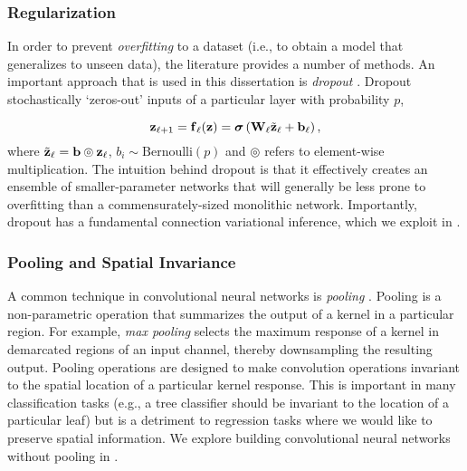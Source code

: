 \subsubsection{Regularization}

In order to prevent \textit{overfitting} to a dataset (i.e., to obtain a model that generalizes to unseen data), the literature provides a number of methods. An important approach that is used in this dissertation is \textit{dropout} \citep{srivastava_dropout_2014}. Dropout stochastically `zeros-out' inputs of a particular layer with probability $p$, 

\begin{equation}
	\boldsymbol{\mathbf{z}}_{\ell+1} = \boldsymbol{\mathbf{f}}_\ell(\boldsymbol{\mathbf{z}}) = \boldsymbol{\mathbf{\sigma}}\left(\boldsymbol{\mathbf{W}}_\ell\tilde{\boldsymbol{\mathbf{z}}}_\ell + \boldsymbol{\mathbf{b}}_\ell\right),
\end{equation}
where $\tilde{\boldsymbol{\mathbf{z}}}_\ell = \boldsymbol{\mathbf{b}} \circledcirc \boldsymbol{\mathbf{z}}_\ell$, $b_i \sim \text{Bernoulli}(p)$ and $\circledcirc$ refers to element-wise multiplication.
The intuition behind dropout is that it effectively creates an ensemble of smaller-parameter networks that will generally be less prone to overfitting than a commensurately-sized monolithic network. Importantly, dropout has a fundamental connection variational inference, which we exploit in .
\subsubsection{Pooling and Spatial Invariance}
A common technique in convolutional neural networks is \textit{pooling} \citep{Goodfellow-et-al-2016}. Pooling is a non-parametric operation that summarizes the output of a kernel in a particular region. For example, \textit{max pooling} selects the maximum response of a kernel in demarcated regions of an input channel, thereby downsampling the resulting output. Pooling operations are designed to make convolution operations invariant to the spatial location of a particular kernel response. This is important in many classification tasks (e.g., a tree classifier should be invariant to the location of a particular leaf) but is a detriment to regression tasks where we would like to preserve spatial information. We explore building convolutional neural networks without pooling in .



 